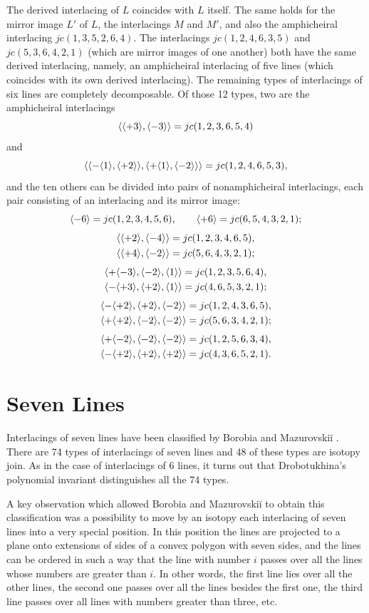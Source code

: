 \documentclass{article}
\begin{document}
The derived interlacing of $L$ coincides with $L$ itself. The same holds for
the mirror image $L'$ of $L$, the interlacings $M$ and $M'$, and also the
amphicheiral interlacing $jc(1,3,5,2,6,4)$. The interlacings $jc(1,2,4,6,3,5)$ and
$jc(5,3,6,4,2,1)$ (which are mirror images of one another) both have the same
derived interlacing, namely, an amphicheiral interlacing of five lines 
(which coincides with its own derived interlacing). The
remaining types of interlacings of six lines are completely decomposable. Of
those 12 types, two are the amphicheiral interlacings
$$\langle\langle+3\rangle,\langle-3\rangle\rangle=jc(1,2,3,6,5,4)$$
and
$$\langle\langle-\langle1\rangle,
\langle+2\rangle\rangle,\langle+\langle1\rangle,\langle-2\rangle\rangle\rangle=jc(1,2,4,6,5,3),$$
and the ten others can be divided into pairs of nonamphicheiral interlacings, each
pair consisting of an interlacing and its mirror image:
$$\langle-6\rangle=jc(1,2,3,4,5,6),\qquad\langle+6\rangle=jc(6,5,4,3,2,1);$$
\begin{align}
&\langle\langle+2\rangle,\langle-4\rangle\rangle=jc(1,2,3,4,6,5),\\
&\langle\langle+4\rangle,\langle-2\rangle\rangle=jc(5,6,4,3,2,1);\end{align}
\begin{align}
&\langle+\langle-3\rangle,\langle-2\rangle,\langle1\rangle\rangle=jc(1,2,3,5,6,4),\\
&\langle-\langle+3\rangle,\langle+2\rangle,\langle1\rangle\rangle=jc(4,6,5,3,2,1);\end{align}
\begin{align}
&\langle-\langle+2\rangle,\langle+2\rangle,\langle-2\rangle\rangle=jc(1,2,4,3,6,5),\\
&\langle+\langle+2\rangle,\langle-2\rangle,\langle-2\rangle\rangle=jc(5,6,3,4,2,1);\end{align}
\begin{align}
&\langle+\langle-2\rangle,\langle-2\rangle,\langle-2\rangle\rangle=jc(1,2,5,6,3,4),\\
&\langle-\langle+2\rangle,\langle+2\rangle,\langle+2\rangle\rangle=jc(4,3,6,5,2,1).\end{align}

\section{Seven Lines}

Interlacings of seven lines have been classified by Borobia and 
Mazurovski\u{i}  \cite{BM}. There are 74 types of interlacings of
seven lines and 48 of these types are isotopy join. As in the case of
interlacings of 6 lines, it turns out that Drobotukhina's polynomial
invariant distinguishes all the 74 types. 

A key observation which allowed Borobia and Mazurovski\u{i} to obtain
this classification was a possibility to move by an isotopy each
interlacing of seven lines into a very special position. In this
position the lines are projected to a plane onto extensions of sides of
a convex polygon with seven sides, and the lines can be ordered in such
a way that the line with number $i$ passes over all the lines whose
numbers are greater than $i$.  In other words, the first line lies over
all the other lines, the second one passes over all the lines besides
the first one, the third line passes over all lines with numbers
greater than three, etc.
\end{document}
